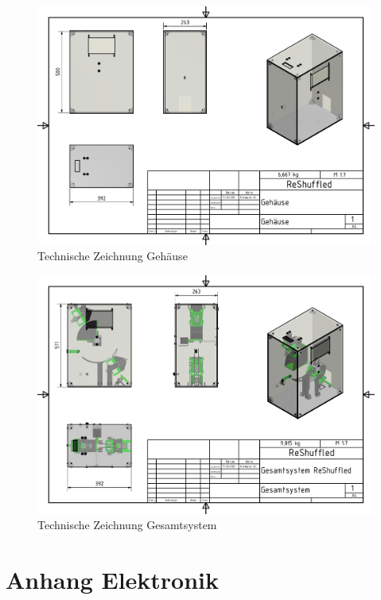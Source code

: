 \begin{figure}[hb]
    \centering
    \includegraphics[scale=0.85,page=1]{fig/mech/Gehaeuse.pdf}
    \caption{Technische Zeichnung Gehäuse}
\end{figure}

\begin{figure}[hb]
    \centering
    \includegraphics[scale=0.85,page=1]{fig/mech/Gesamtsystem.pdf}
    \caption{Technische Zeichnung Gesamtsystem}
\end{figure}
\chapter{Anhang Elektronik}

